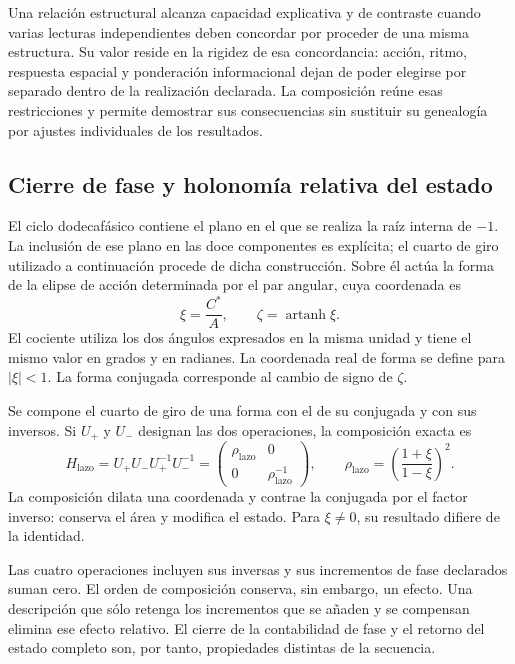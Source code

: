 Una relación estructural alcanza capacidad explicativa y de contraste
cuando varias lecturas independientes deben concordar por proceder de una
misma estructura. Su valor reside en la rigidez de esa concordancia:
acción, ritmo, respuesta espacial y ponderación informacional dejan de
poder elegirse por separado dentro de la realización declarada. La
composición reúne esas restricciones y permite demostrar sus consecuencias
sin sustituir su genealogía por ajustes individuales de los resultados.

\subsection{Cierre de fase y holonomía relativa del estado}
\label{subsec:narrativa-holonomia-relativa}

El ciclo dodecafásico contiene el plano en el que se realiza la raíz
interna de $-1$. La inclusión de ese plano en las doce componentes es
explícita; el cuarto de giro utilizado a continuación procede de dicha
construcción. Sobre él actúa la forma de la elipse de acción determinada
por el par angular, cuya coordenada es
\begin{equation}
 \xi=\frac{C^*}{A},\qquad
 \zeta=\operatorname{artanh}\xi.
 \label{eq:narrativa-coordenada-forma}
\end{equation}
El cociente utiliza los dos ángulos expresados en la misma unidad y tiene
el mismo valor en grados y en radianes. La coordenada real de forma se
define para $|\xi|<1$. La forma conjugada corresponde al
cambio de signo de $\zeta$.

Se compone el cuarto de giro de una forma con el de su conjugada y con
sus inversos. Si $U_+$ y $U_-$ designan las dos operaciones, la
composición exacta es
\begin{equation}
 \boxed{
 H_{\mathrm{lazo}}=U_+U_-U_+^{-1}U_-^{-1}
 =\begin{pmatrix}\rho_{\mathrm{lazo}}&0\\[2pt]
                  0&\rho_{\mathrm{lazo}}^{-1}\end{pmatrix},
 \qquad
 \rho_{\mathrm{lazo}}=
 \left(\frac{1+\xi}{1-\xi}\right)^2.}
 \label{eq:narrativa-holonomia-lazo}
\end{equation}
La composición dilata una coordenada y contrae la conjugada por el factor
inverso: conserva el área y modifica el estado. Para $\xi\ne0$, su
resultado difiere de la identidad.

Las cuatro operaciones incluyen sus inversas y sus incrementos de fase
declarados suman cero. El orden de composición conserva, sin embargo, un
efecto. Una descripción que sólo retenga los incrementos que se añaden y
se compensan elimina ese efecto relativo. El cierre de la contabilidad
de fase y el retorno del estado completo son, por tanto, propiedades
distintas de la secuencia.

